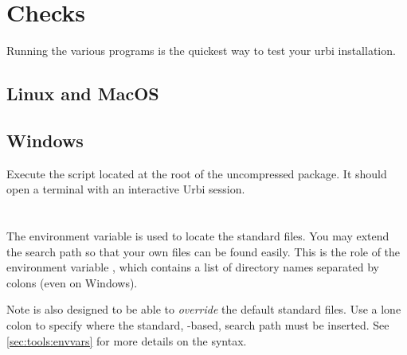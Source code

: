 \section{Checks}

Running the various programs is the quickest way to test your urbi
installation.

\subsection{Linux and MacOS}


\subsection{Windows}

Execute the  script located at the root of the
uncompressed package. It should open a terminal with an interactive
Urbi session.


\section{}

The environment variable  is used to locate the \us
standard files.  You may extend the search path so that your own \us
files can be found easily.  This is the role of the environment
variable , which contains a list of directory names
separated by colons (even on Windows).

Note  is also designed to be able to \emph{override}
the default standard files.  Use a lone colon to specify where the
standard, -based, search path must be inserted.  See
\autoref{sec:tools:envvars} for more details on the syntax.

